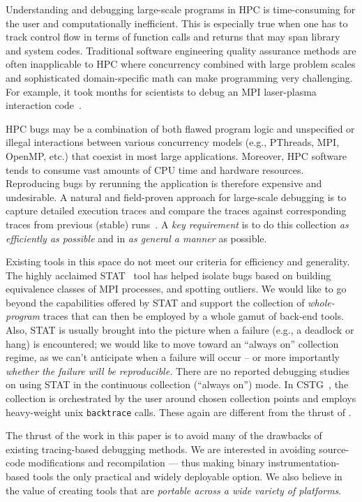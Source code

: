 Understanding and debugging large-scale programs in HPC 
is time-consuming for the user and computationally inefficient.
%
This is especially true when one has to 
track control flow in terms of function calls and returns that may
span library and system codes. 
%
Traditional software engineering quality assurance methods are 
often inapplicable to HPC where concurrency combined with 
large problem scales and sophisticated domain-specific math can make programming 
very challenging. 
%
For example, it took months for scientists to debug an MPI laser-plasma interaction 
code~\cite{hpcdoe}.


HPC bugs may be a combination of both flawed program logic and unspecified or illegal interactions between various concurrency models (e.g., PThreads, MPI, OpenMP, etc.) that coexist in most large applications. Moreover, HPC software tends to consume vast amounts of CPU time and hardware resources. Reproducing bugs by rerunning the application is therefore expensive and undesirable. 
A natural and field-proven approach for large-scale debugging is to capture detailed execution traces and compare the traces against corresponding traces from previous (stable) runs~\cite{stat,cstg}.
%
A {\em key requirement} is to do this collection {\em as efficiently as possible}
and in {\em as general a manner} as possible.


Existing tools in this space
do not meet our criteria for efficiency and generality.
%
The highly acclaimed STAT~\cite{stat} tool has helped isolate
bugs based on building equivalence classes of MPI processes, and spotting
outliers.
%
We would like to go beyond the capabilities offered by STAT and support
the collection of {\em whole-program} traces that can then be employed
by a whole gamut of back-end tools.
%
Also, STAT is usually brought into the picture
when a failure (e.g., a deadlock or hang) is encountered; we would like
to move toward an ``always on'' collection regime, as we can't anticipate
when a failure will occur -- or more importantly {\em whether the failure
will be reproducible.}
%
There are no reported debugging studies on using STAT in the
continuous collection (``always on'') mode.
%
In CSTG~\cite{cstg}, the collection is orchestrated by the
user around chosen collection points and employs heavy-weight
unix {\tt backtrace} calls.
%
These again are different from the thrust of \parlot.


The thrust of the work in this paper is to avoid many of the drawbacks of existing
tracing-based debugging methods.
%
We are interested in avoiding
source-code modifications and recompilation --- thus making binary
instrumentation-based tools the only practical and widely deployable option.
%
We also believe in the value
of creating tools that are {\em portable across a 
wide variety of platforms}.
%

